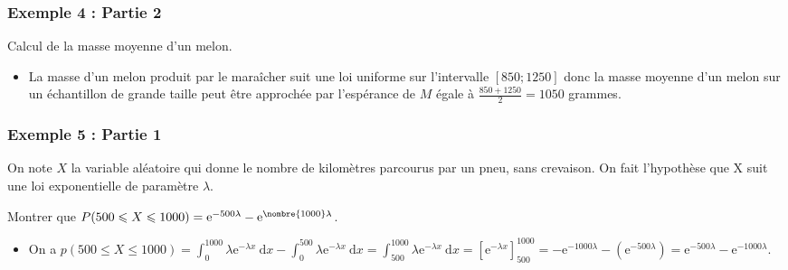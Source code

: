 \documentclass[xcolor=svgnames,t,final]{beamer}
\begin{document}
\begin{frame}

\frametitle{Exemple 4 : Partie 2}


Calcul de la masse moyenne d'un melon.

\begin{itemize}

\pause \item La masse d'un melon produit par le maraîcher suit une loi uniforme sur l'intervalle $[850;1250]$ donc   la masse moyenne d'un melon sur un échantillon de grande taille peut être approchée par l'espérance de $M$ égale à $\frac{850+1250}{2}=1050$ grammes.

\end{itemize}



\end{frame}

\begin{frame}

\frametitle{Exemple 5 : Partie 1}

On note $X$ la variable aléatoire qui donne le nombre de kilomètres parcourus par un pneu, sans crevaison. On fait l'hypothèse que X suit une loi exponentielle de paramètre $\lambda$.

Montrer que $P(500\leqslant X\leqslant 1000) =\mathrm{e}^{-500\lambda}-\mathrm{e}^{\nombre{1000}\lambda}$.

\begin{itemize}

\pause \item 
On a $p(500 \leqslant X \leqslant 1000) = \displaystyle\int_{0}^{1000}\lambda\mathrm{e}^{-\lambda x}\:\text{d}x - \displaystyle\int_{0}^{500}\lambda\mathrm{e}^{-\lambda x}\:\text{d}x = \displaystyle\int_{500}^{1000}\lambda\mathrm{e}^{-\lambda x}\:\text{d}x = \left[\text{e}^{-\lambda x} \right]_{500}^{1000} = - \text{e}^{-1000\lambda} - \left(\text{e}^{-500\lambda} \right) = \text{e}^{-500\lambda} - \text{e}^{-1000\lambda}$.

\end{itemize}



\end{frame}
\end{document}
